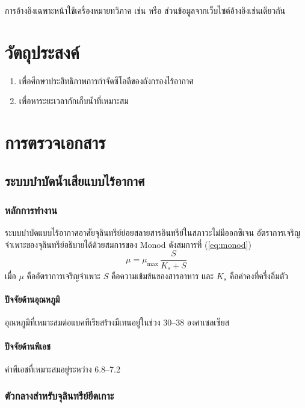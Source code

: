\documentclass[thai]{kuthesis}
\begin{document}
การอ้างอิงเฉพาะหน้าใช้เครื่องหมายทวิภาค เช่น \parencite[2-5]{pitchapa2552}
หรือ \textcite[3]{bago2000} ส่วนข้อมูลจากเว็บไซต์อ้างอิงเช่นเดียวกัน \parencite{moac2551,who2006}

\chapter{วัตถุประสงค์}

\begin{enumerate}
  \item เพื่อศึกษาประสิทธิภาพการกำจัดซีโอดีของถังกรองไร้อากาศ
  \item เพื่อหาระยะเวลากักเก็บน้ำที่เหมาะสม
\end{enumerate}

\chapter{การตรวจเอกสาร}

\section{ระบบบำบัดน้ำเสียแบบไร้อากาศ}

\subsection{หลักการทำงาน}

ระบบบำบัดแบบไร้อากาศอาศัยจุลินทรีย์ย่อยสลายสารอินทรีย์ในสภาวะไม่มีออกซิเจน
อัตราการเจริญจำเพาะของจุลินทรีย์อธิบายได้ด้วยสมการของ Monod ดังสมการที่ (\ref{eq:monod})
\begin{equation}
  \mu = \mu_{\max}\,\frac{S}{K_s + S} \label{eq:monod}
\end{equation}
เมื่อ $\mu$ คืออัตราการเจริญจำเพาะ $S$ คือความเข้มข้นของสารอาหาร
และ $K_s$ คือค่าคงที่ครึ่งอิ่มตัว

\subsubsection{ปัจจัยด้านอุณหภูมิ}
อุณหภูมิที่เหมาะสมต่อแบคทีเรียสร้างมีเทนอยู่ในช่วง 30--38 องศาเซลเซียส

\subsubsection{ปัจจัยด้านพีเอช}
ค่าพีเอชที่เหมาะสมอยู่ระหว่าง 6.8--7.2

\subsection{ตัวกลางสำหรับจุลินทรีย์ยึดเกาะ}
\end{document}
